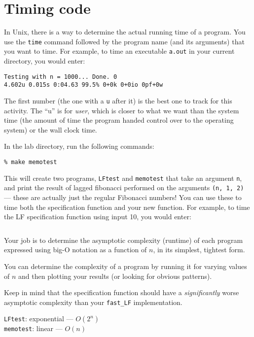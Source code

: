 \section*{Timing code}

In Unix, there is a way to determine the actual running time of a
program.  You use the \lstinline'time' command followed by the program
name (and its arguments) that you want to time.  For example, to time
an executable \lstinline'a.out' in your current directory, you would
enter:

\begin{lstlisting}[language={[coin]C}]
% time ./a.out
Testing with n = 1000... Done. 0
4.602u 0.015s 0:04.63 99.5% 0+0k 0+0io 0pf+0w
\end{lstlisting}
The first number (the one with a \lstinline'u' after it) is the best
one to track for this activity. The ``u'' is for \emph{user}, which is
closer to what we want than the system time (the amount of time the
program handed control over to the operating system) or the wall clock
time.

\begin{part}
  In the lab directory, run the following commands:

\begin{lstlisting}[language={[coin]C}]
% make LFtest
% make memotest
\end{lstlisting}

This will create two programs, \lstinline'LFtest' and
\lstinline'memotest' that take an argument \lstinline'n', and print
the result of lagged fibonacci performed on the arguments
\lstinline'(n, 1, 2)' --- these are actually just the regular Fibonacci
numbers!  You can use these to time both the specification function
and your new function. For example, to time the LF specification
function using input 10, you would enter:

\begin{lstlisting}[language={[coin]C}]
% time ./LFtest 10
\end{lstlisting}

Your job is to determine the asymptotic complexity (runtime) of each
program expressed using big-O notation as a function of $n$, in its
simplest, tightest form.
\end{part}

You can determine the complexity of a program by running it for
varying values of $n$ and then plotting your results (or looking for
obvious patterns).

Keep in mind that the specification function should have a
\emph{significantly} worse asymptotic complexity than your
\lstinline'fast_LF' implementation.

\threePT

\begin{solution}\par
\begin{minipage}{0.5\textwidth}
  \lstinline'LFtest': exponential --- $O(2^n)$
\\\lstinline'memotest': linear --- $O(n)$
\end{minipage}
\end{solution}
